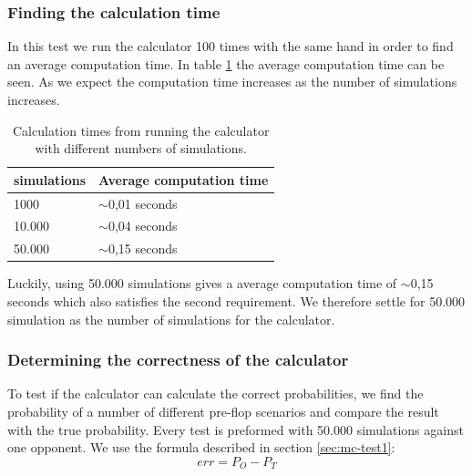 \subsubsection{Finding the calculation time}
In this test we run the calculator 100 times with the same hand in order to find an average computation time. 
In table \ref{tab:mc-time} the average computation time can be seen. As we expect the computation time increases as the number of simulations increases. 

\vspace{4mm}
\begin{table}[H]
  \center
  \begin{tabular}{ | l | l | }
    \hline
    simulations & Average computation time\\
    \hline                       
    1000 & $\sim$0,01 seconds\\
    10.000 & $\sim$0,04 seconds\\
    50.000 & $\sim$0,15 seconds\\
  \hline  
  \end{tabular}
  \caption{Calculation times from running the calculator with different numbers of simulations. \label{tab:mc-time}}
\end{table}
\vspace{4mm}

Luckily, using 50.000 simulations gives a average computation time of $\sim$0,15 seconds which also satisfies the second requirement. We therefore settle for 50.000 simulation as the number of simulations for the calculator.

\subsubsection{Determining the correctness of the calculator}
To test if the calculator can calculate the correct probabilities, we find the probability of a number of different pre-flop scenarios and compare the result with the true probability. Every test is preformed with 50.000 simulations against one opponent. We use the formula described in section \ref{sec:mc-test1}:
\[err = P_{O} - P_{T}\]

